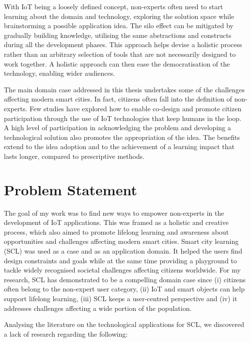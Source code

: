 With IoT being a loosely defined concept, non-experts often need to start learning about the domain and technology, exploring the solution space while brainstorming a possible application idea. The silo effect can be mitigated by gradually building knowledge, utilising the same abstractions and constructs during all the development phases. This approach helps devise a holistic process rather than an arbitrary selection of tools that are not necessarily designed to work together. A holistic approach can then ease the democratisation of the technology, enabling wider audiences.

The main domain case addressed in this thesis undertakes some of the challenges affecting modern smart cities. In fact, citizens often fall into the definition of non-experts. Few studies have explored how to enable co-design and promote citizen participation through the use of IoT technologies that keep humans in the loop. A high level of participation in acknowledging the problem and developing a technological solution also promotes the appropriation of the idea. The benefits extend to the idea adoption and to the achievement of a learning impact that lasts longer, compared to prescriptive methods.


\section{Problem Statement}
\label{sec:problem-statement}

The goal of my work was to find new ways to empower non-experts in the development of IoT applications. This was framed as a holistic and creative process, which also aimed to promote lifelong learning and awareness about opportunities and challenges affecting modern smart cities. Smart city learning (SCL) was used as a case and as an application domain. It helped the users find design constraints and goals while at the same time providing a playground to tackle widely recognised societal challenges affecting citizens worldwide. For my research, SCL has demonstrated to be a compelling domain case since (i) citizens often belong to the non-expert user category, (ii) IoT and smart objects can help support lifelong learning, (iii) SCL keeps a user-centred perspective and (iv) it addresses challenges affecting a wide portion of the population.

Analysing the literature on the technological applications for SCL, we discovered a lack of research regarding the following:

